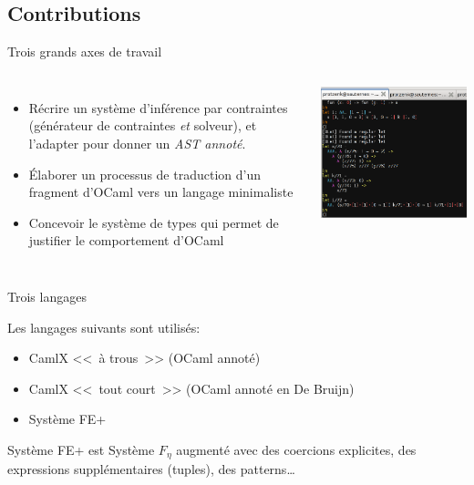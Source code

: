 \documentclass[final]{beamer}
\begin{document}
\subsection{Contributions}

\begin{frame}{Trois grands axes de travail}
  \begin{columns}
      \begin{itemize}
        \item Récrire un système d'inférence par contraintes (générateur de
          contraintes \emph{et} solveur), et l'adapter pour
          donner un \emph{AST annoté}.
        \item Élaborer un processus de traduction d'un fragment d'OCaml vers un
          langage minimaliste
        \item Concevoir le système de types qui permet de justifier le comportement
          d'OCaml
      \end{itemize}
      \includegraphics[width=\columnwidth]{screen1.png}
  \end{columns}
\end{frame}

\begin{frame}{Trois langages}

  Les langages suivants sont utilisés:
  \begin{itemize}
    \item CamlX <<~à trous~>> (OCaml annoté)
    \item CamlX <<~tout court~>> (OCaml annoté en De Bruijn)
    \item Système FE+
  \end{itemize}

  Système FE+ est Système $F_\eta$ augmenté avec des coercions explicites, des
  expressions supplémentaires (tuples), des patterns\dots
\end{frame}
\end{document}

